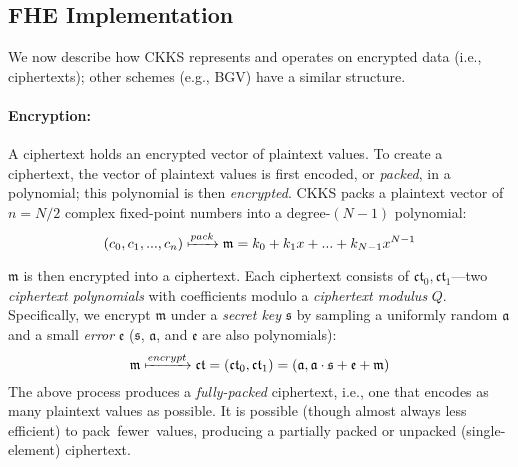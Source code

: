 \subsection{FHE Implementation}

We now describe how CKKS represents and operates on encrypted data (i.e., ciphertexts);
other schemes
(e.g., BGV)
have a similar structure.

\paragraph{Encryption:} A ciphertext holds an encrypted vector of plaintext values.
To create a ciphertext, the vector of plaintext values is first encoded, or \emph{packed},
in a polynomial; this polynomial is then \emph{encrypted}.
CKKS packs a plaintext vector of $ n = N/2$ complex fixed-point numbers
into a degree-$(N-1)$ polynomial:
\begin{equation*}
    (c_0, c_1, ..., c_n) \xmapsto{pack} \mathfrak{m} = k_0 + k_1x + ... + k_{N-1}x^{N-1} %
\end{equation*}

$\mathfrak{m}$ is then encrypted into a ciphertext. Each ciphertext consists of
$\mathfrak{ct}_0, \mathfrak{ct}_1$---two \emph{ciphertext polynomials}
with coefficients modulo a \emph{ciphertext modulus} $Q$.
Specifically, we encrypt $\mathfrak{m}$
under a \emph{secret key} $\mathfrak{s}$
by sampling a uniformly random $\mathfrak{a}$
and a small \emph{error} $\mathfrak{e}$ ($\mathfrak{s}$, $\mathfrak{a}$, and $\mathfrak{e}$ are also polynomials):
\begin{equation*}
    \mathfrak{m} \xmapsto{encrypt} \mathfrak{ct} = (\mathfrak{ct}_0, \mathfrak{ct}_1) = (\mathfrak{a}, \mathfrak{a}\cdot\mathfrak{s}+\mathfrak{e}+\mathfrak{m})
\end{equation*}
The above process produces a \emph{fully-packed} ciphertext, i.e., one
that encodes as many plaintext values as possible. It is possible
(though almost always less efficient) to pack~fewer~values,
producing a partially packed or unpacked (single-element) ciphertext.

